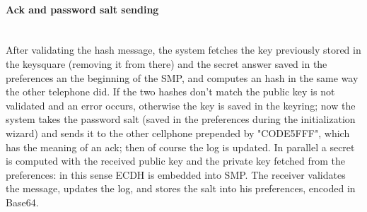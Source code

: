 \paragraph{Ack and password salt sending} \hspace{0pt} \\
After validating the hash message, the system fetches the key previously stored in the keysquare (removing it from there) and the secret answer saved in the preferences an the beginning of the SMP, and computes an hash in the same way the other telephone did. If the two hashes don't match the public key is not validated and an error occurs, otherwise the key is saved in the keyring; now the system takes the password salt (saved in the preferences during the initialization wizard) and sends it to the other cellphone prepended by "CODE5FFF", which has the meaning of an ack; then of course the log is updated. In parallel a secret is computed with the received public key and the private key fetched from the preferences: in this sense ECDH is embedded into SMP. The receiver validates the message, updates the log, and stores the salt into his preferences, encoded in Base64.